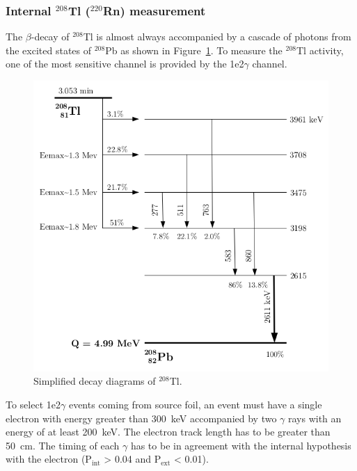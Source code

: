 \documentclass[main.tex]{subfiles}
\begin{document}
\FloatBarrier


\subsubsection{Internal $^{\text{208}}$Tl ($^{\text{220}}$Rn) measurement}


\NI The $\beta$-decay of $^{\text{208}}$Tl is almost always accompanied by a cascade of photons from the excited states of $^{\text{208}}$Pb as shown in Figure~\ref{Tl208-decay-schema}. To measure the $^{\text{208}}$Tl activity, one of the most sensitive channel is provided by the 1e2$\gamma$ channel.


\begin{figure}[h!]
\centering
\includegraphics[scale=0.40]{pictures/Chap6/decay-tl208.png}
\caption{Simplified decay diagrams of $^{\text{208}}$Tl.}
\label{Tl208-decay-schema}
\end{figure}


\NI To select 1e2$\gamma$ events coming from source foil, an event must have a single electron with energy greater than 300~keV accompanied by two $\gamma$ rays with an energy of at least 200~keV. The electron track length has to be greater than 50~cm. The timing of each $\gamma$ has to be in agreement with the internal hypothesis with the electron (P$_{\text{int}}$ > 0.04 and P$_{\text{ext}}$ < 0.01). 
\end{document}
